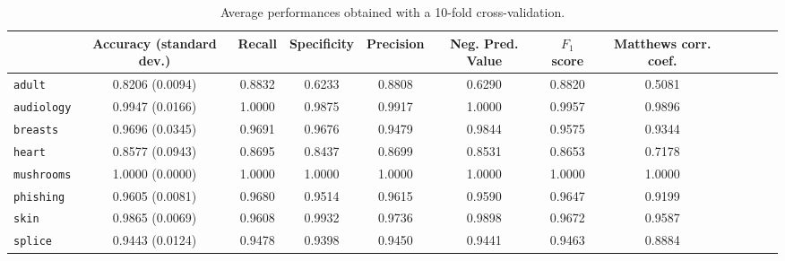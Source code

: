 \documentclass[sigconf,edbt]{acmart-edbt-workshops}
\begin{document}
\begin{table}[htbp]
\begin{center}
  \caption{Average performances obtained with a 10-fold cross-validation.}
  \begin{small}
  \begin{tabular}{|l|c|c|c|c|c|c|c|c|c|c|c|}
    \hline
     & Accuracy (standard dev.) & Recall & Specificity & Precision & Neg. Pred. Value & $F_1$ score & Matthews corr. coef.\\
    \hline
    \texttt{adult} & 0.8206 (0.0094) & 0.8832 & 0.6233 & 0.8808 & 0.6290 & 0.8820 & 0.5081\\
    \texttt{audiology} & 0.9947 (0.0166) & 1.0000 & 0.9875 & 0.9917 & 1.0000 & 0.9957 & 0.9896\\
    \texttt{breasts} & 0.9696 (0.0345) & 0.9691 & 0.9676 & 0.9479 & 0.9844 & 0.9575 & 0.9344\\
    \texttt{heart} & 0.8577 (0.0943) & 0.8695 & 0.8437 & 0.8699 & 0.8531 & 0.8653 & 0.7178\\
    \texttt{mushrooms} & 1.0000 (0.0000) & 1.0000 & 1.0000 & 1.0000 & 1.0000 & 1.0000 & 1.0000\\
    \texttt{phishing} & 0.9605 (0.0081) & 0.9680 & 0.9514  & 0.9615 & 0.9590 & 0.9647 & 0.9199\\
    \texttt{skin} & 0.9865 (0.0069) & 0.9608 & 0.9932  &0.9736 & 0.9898 & 0.9672 & 0.9587 \\
    \texttt{splice} & 0.9443 (0.0124) & 0.9478 & 0.9398 & 0.9450 & 0.9441 & 0.9463 & 0.8884\\
    \hline
  \end{tabular}
  \end{small}
  \label{table:perf_indicators}
\end{center}
\end{table}
\end{document}

